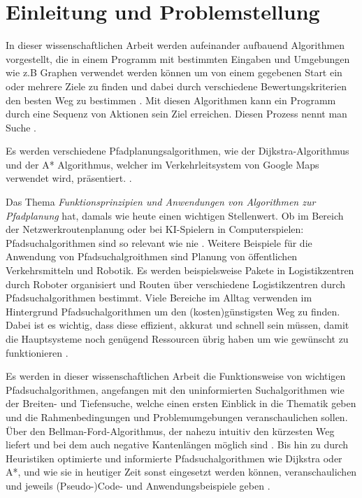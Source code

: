 \chapter{Einleitung und Problemstellung}
\label{Einleitung und Problemstellung}

In dieser wissenschaftlichen Arbeit werden aufeinander aufbauend Algorithmen vorgestellt, die in einem Programm mit bestimmten Eingaben und Umgebungen 
wie z.B Graphen verwendet werden können um von einem gegebenen Start ein oder mehrere Ziele zu finden und dabei durch verschiedene Bewertungskriterien den besten Weg zu bestimmen \cite{Esri:00}.
Mit diesen Algorithmen kann ein Programm durch eine Sequenz von Aktionen sein Ziel erreichen. Diesen Prozess nennt man Suche \cite[105,106]{Russell:10}.

Es werden verschiedene Pfadplanungsalgorithmen, wie der Dijkstra-Algorithmus und der A* Algorithmus, 
welcher im Verkehrleitsystem von Google Maps verwendet wird, präsentiert. \cite{Mehta:19}. 

Das Thema \emph{Funktionsprinzipien und Anwendungen von Algorithmen zur Pfadplanung} hat, damals wie heute einen wichtigen Stellenwert. 
Ob im Bereich der Netzwerkroutenplanung oder bei KI-Spielern in Computerspielen: Pfadsuchalgorithmen sind so relevant wie nie \cite{Foeada:21}. 
Weitere Beispiele für die Anwendung von Pfadsuchalgroithmen sind Planung von öffentlichen Verkehrsmitteln und 
Robotik. Es werden beispielsweise Pakete in Logistikzentren durch Roboter organisiert und Routen über verschiedene Logistikzentren durch Pfadsuchalgorithmen bestimmt.
Viele Bereiche im Alltag verwenden im Hintergrund Pfadsuchalgorithmen um den (kosten)günstigsten Weg zu finden. Dabei ist es wichtig, 
dass diese effizient, akkurat und schnell sein müssen, damit die Hauptsysteme noch genügend Ressourcen übrig haben um wie gewünscht zu funktionieren \cite{Foeada:21}. 

Es werden in dieser wissenschaftlichen Arbeit die Funktionsweise von wichtigen Pfadsuchalgorithmen, angefangen mit den uninformierten Suchalgorithmen wie der Breiten- und Tiefensuche, 
welche einen ersten Einblick in die Thematik geben und die Rahmenbedingungen und Problemumgebungen veranschaulichen sollen. 
Über den Bellman-Ford-Algorithmus, der nahezu intuitiv den kürzesten Weg liefert und bei dem auch negative Kantenlängen möglich sind \cite{Mukhlif:20}. 
Bis hin zu durch Heuristiken optimierte und informierte Pfadsuchalgorithmen wie Dijkstra oder A*, und wie sie in heutiger Zeit 
sonst eingesetzt werden können, veranschaulichen und jeweils (Pseudo-)Code- und Anwendungsbeispiele geben \cite[64]{Russell:10}.
